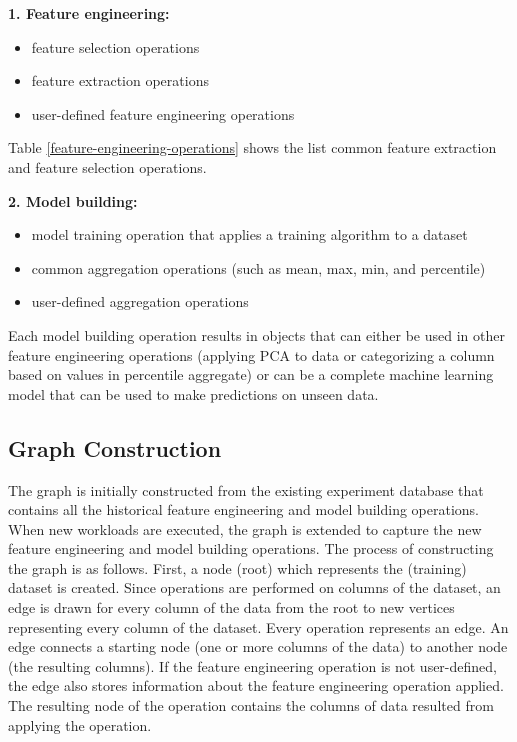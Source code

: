 \textbf{1. Feature engineering:}
\begin{itemize}
\item feature selection operations
\item feature extraction operations
\item user-defined feature engineering operations
\end{itemize}

Table \ref{feature-engineering-operations} shows the list common feature extraction and feature selection operations.

\textbf{2. Model building: }
\begin{itemize}
\item model training operation that applies a training algorithm to a dataset
\item common aggregation operations (such as mean, max, min, and percentile)
\item user-defined aggregation operations 
\end{itemize}
Each model building operation results in objects that can either be used in other feature engineering operations (applying PCA to data or categorizing a column based on values in percentile aggregate) or can be a complete machine learning model that can be used to make predictions on unseen data.

\subsection{Graph Construction}
The graph is initially constructed from the existing experiment database that contains all the historical feature engineering and model building operations.
When new workloads are executed, the graph is extended to capture the new feature engineering and model building operations.
The process of constructing the graph is as follows.
First, a node (root) which represents the (training) dataset is created.
Since operations are performed on columns of the dataset, an edge is drawn for every column of the data from the root to new vertices representing every column of the dataset.
Every operation represents an edge.
An edge connects a starting node (one or more columns of the data) to another node (the resulting columns).
If the feature engineering operation is not user-defined, the edge also stores information about the feature engineering operation applied.
The resulting node of the operation contains the columns of data resulted from applying the operation.


